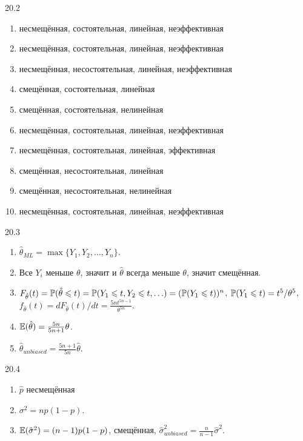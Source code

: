 \protect \hypertarget {soln:20.2}{}
\begin{solution}{{20.2}}
    \begin{enumerate}
    \item несмещённая, состоятельная, линейная, неэффективная
    \item несмещённая, состоятельная, линейная, неэффективная
    \item несмещённая, несостоятельная, линейная, неэффективная
    \item смещённая, состоятельная, линейная
    \item смещённая, состоятельная, нелинейная
    \item несмещённая, состоятельная, линейная, неэффективная
    \item несмещённая, состоятельная, линейная, эффективная
    \item смещённая, несостоятельная, линейная
    \item смещённая, несостоятельная, нелинейная
    \item несмещённая, состоятельная, линейная, неэффективная
    \end{enumerate}
  
\end{solution}
\protect \hypertarget {soln:20.3}{}
\begin{solution}{{20.3}}
\begin{enumerate}
\item $\hat\theta_{ML} = \max\{ Y_1, Y_2, \ldots, Y_n\}$.
\item Все $Y_i$ меньше $\theta$, значит и $\hat\theta$ всегда меньше $\theta$, значит смещённая.
\item $F_{\hat\theta}(t) = \P(\hat\theta \leq t) = \P(Y_1 \leq t, Y_2 \leq t, \ldots) = (\P(Y_1 \leq t))^n$, $\P(Y_1 \leq t) = t^5/\theta^5$, $f_{\hat\theta}(t) = dF_{\hat\theta}(t)/dt = \frac{5n t^{5n-1}}{\theta^{5n}}$.
\item $\E(\hat\theta) = \frac{5n}{5n+1}\theta$.
\item $\hat\theta_{unbiased} = \frac{5n+1}{5n}\hat\theta$.
\end{enumerate}
\end{solution}
\protect \hypertarget {soln:20.4}{}
\begin{solution}{{20.4}}
\begin{enumerate}
  \item $\hat p$ несмещённая
  \item $\sigma^2 = n p(1-p)$.
  \item $\E(\hat\sigma^2) = (n-1)p(1-p)$, смещённая, $\hat\sigma^2_{unbiased} = \frac{n}{n-1} \hat\sigma^2$.
\end{enumerate}
\end{solution}
